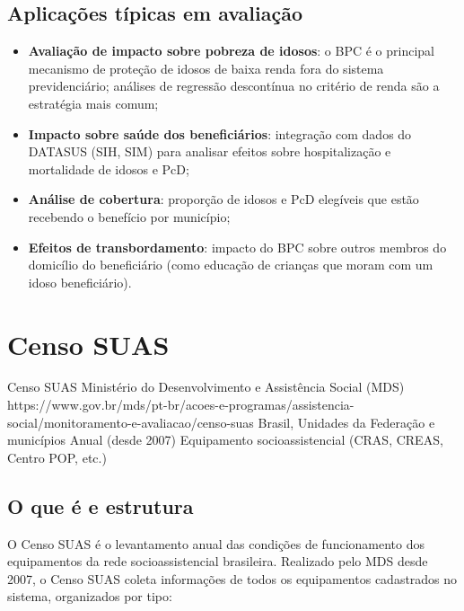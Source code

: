 \subsection{Aplicações típicas em avaliação}

\begin{itemize}
  \item \textbf{Avaliação de impacto sobre pobreza de idosos}: o BPC é o principal mecanismo de proteção de idosos de baixa renda fora do sistema previdenciário; análises de regressão descontínua no critério de renda são a estratégia mais comum;
  \item \textbf{Impacto sobre saúde dos beneficiários}: integração com dados do DATASUS (SIH, SIM) para analisar efeitos sobre hospitalização e mortalidade de idosos e PcD;
  \item \textbf{Análise de cobertura}: proporção de idosos e PcD elegíveis que estão recebendo o benefício por município;
  \item \textbf{Efeitos de transbordamento}: impacto do BPC sobre outros membros do domicílio do beneficiário (como educação de crianças que moram com um idoso beneficiário).
\end{itemize}

\section{Censo SUAS}

\ficharapida
  {Censo SUAS}
  {Ministério do Desenvolvimento e Assistência Social (MDS)}
  {https://www.gov.br/mds/pt-br/acoes-e-programas/assistencia-social/monitoramento-e-avaliacao/censo-suas}
  {Brasil, Unidades da Federação e municípios}
  {Anual (desde 2007)}
  {Equipamento socioassistencial (CRAS, CREAS, Centro POP, etc.)}

\subsection{O que é e estrutura}

O Censo SUAS é o levantamento anual das condições de funcionamento dos equipamentos da rede socioassistencial brasileira. Realizado pelo MDS desde 2007, o Censo SUAS coleta informações de todos os equipamentos cadastrados no sistema, organizados por tipo:

